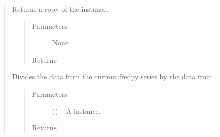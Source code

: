 \documentclass[letterpaper,10pt,openany,oneside,english]{sphinxmanual}
\begin{document}
\begin{fulllineitems}
\begin{quote}
\begin{fulllineitems}
\begin{quote}
\begin{description}
\end{description}\end{quote}

\end{fulllineitems}


\begin{fulllineitems}
\label{\detokenize{series_class:fredpy.series.copy}}
Returns a copy of the {\hyperref[\detokenize{series_class:fredpy.series}]{}} instance.
\begin{quote}\begin{description}
\item[{Parameters}] \leavevmode
None

\item[{Returns}] \leavevmode
{\hyperref[\detokenize{series_class:fredpy.series}]{}}

\end{description}\end{quote}

\end{fulllineitems}


\begin{fulllineitems}
\label{\detokenize{series_class:fredpy.series.divide}}
Divides the data from the current fredpy series by the data from .
\begin{quote}\begin{description}
\item[{Parameters}] \leavevmode
{} ({\hyperref[\detokenize{series_class:fredpy.series}]{}}) -- A {\hyperref[\detokenize{series_class:fredpy.series}]{}} instance.

\item[{Returns}] \leavevmode
{\hyperref[\detokenize{series_class:fredpy.series}]{}}

\end{description}\end{quote}

\end{fulllineitems}


\end{quote}
\end{fulllineitems}
\end{document}
